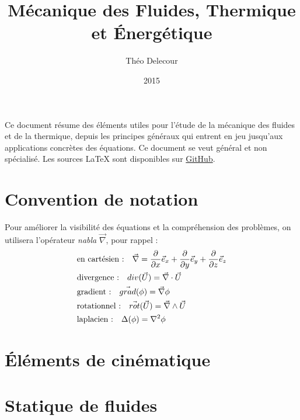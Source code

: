 \documentclass[10pt,a4paper,twocolumn,fleqn]{article}
\title{Mécanique des Fluides, Thermique et Énergétique}
\author{Théo Delecour}
\date{2015}
\begin{document}
\makeatletter

\begin{center}
    \LARGE \@title
    
    \Large \@author
\end{center}

\makeatother

Ce document résume des éléments utiles pour l'étude de la mécanique des fluides et de la thermique, depuis les principes généraux qui entrent en jeu jusqu'aux applications concrètes des équations. Ce document se veut général et non spécialisé. Les sources \LaTeX{} sont disponibles sur \href{https://github.com/theolamayo/flui-ther-fr}{GitHub}.



\section*{Convention de notation}
Pour améliorer la visibilité des équations et la compréhension des problèmes, on utilisera l'opérateur \textit{nabla} $\vec{\nabla}$, pour rappel :
%
\begin{align}
    \notag &\text{en cartésien :} \quad \vec{\nabla} = \frac{\partial}{\partial x} \vec{e}_x + \frac{\partial}{\partial y} \vec{e}_y + \frac{\partial}{\partial z} \vec{e}_z \\
    \notag &\text{divergence :} \quad div (\vec{U}) = \vec{\nabla} \cdot \vec{U} \\
    \notag &\text{gradient :} \quad \vec{grad} (\phi) = \vec{\nabla} \phi \\
    \notag &\text{rotationnel :} \quad \vec{rot} (\vec{U}) = \vec{\nabla} \wedge \vec{U} \\
    \notag &\text{laplacien :} \quad \Delta (\phi) = \nabla^2 \phi
\end{align}


\section{Éléments de cinématique}


\section{Statique de fluides}\label{sec:statique} %

\end{document}

